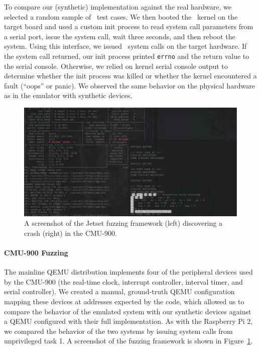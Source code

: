 To compare our (synthetic) implementation against the real hardware, we selected a random sample of \rpiPhysicalTestCases\ test cases.
We then booted the \rpitwo\ kernel on the target board and used a custom init process to read system call parameters from a serial port, issue the system call, wait three seconds, and then reboot the system.
Using this interface, we issued \rpiPhysicalTestCases\ system calls on the target hardware.
If the system call returned, our init process printed \texttt{errno} and the return value to the serial console.
Otherwise, we relied on kernel serial console output to determine whether the init process was killed or whether the kernel encountered a fault (``oops'' or panic).
We observed the same behavior on the physical hardware as in the emulator with synthetic devices.

\begin{figure}[t]
\centering
\includegraphics[width=\linewidth]{fuzzing-output}
\caption{A screenshot of the Jetset fuzzing framework (left) discovering a crash (right) in the CMU-900.}
\label{fig:fuzzing-out}
\end{figure}

\paragraph{CMU-900 Fuzzing}
The mainline QEMU distribution implements four of the peripheral devices used by the CMU-900 (the real-time clock, interrupt controller, interval timer, and serial controller).
We created a manual, ground-truth QEMU configuration mapping these devices at addresses expected by the code, which allowed us to compare the behavior of the emulated system with our synthetic devices against a QEMU configured with their full implementation.
As with the Raspberry Pi 2, we compared the behavior of the two systems by issuing system calls from unprivileged task 1.
A screenshot of the fuzzing framework is shown in Figure~\ref{fig:fuzzing-out}.

